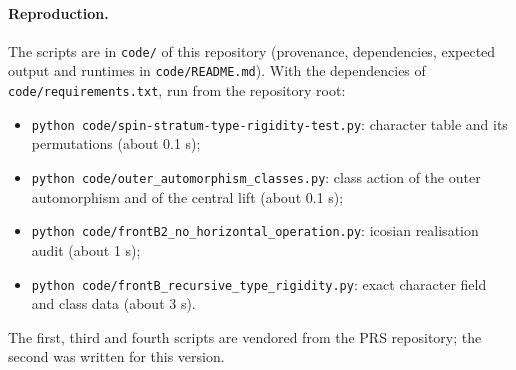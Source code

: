 \documentclass[11pt]{article}
\theoremstyle{definition}
\theoremstyle{remark}
\begin{document}
    \paragraph{Reproduction.}
    The scripts are in \texttt{code/} of this repository (provenance, dependencies, expected output and runtimes in
    \texttt{code/README.md}).
    With the dependencies of \texttt{code/requirements.txt}, run from the repository root:
    \begin{itemize}
      \item \texttt{python code/spin-stratum-type-rigidity-test.py}: character table and its permutations (about 0.1 s);
      \item \texttt{python code/outer\_automorphism\_classes.py}: class action of the outer automorphism and of the
      central lift (about 0.1 s);
      \item \texttt{python code/frontB2\_no\_horizontal\_operation.py}: icosian realisation audit (about 1 s);
      \item \texttt{python code/frontB\_recursive\_type\_rigidity.py}: exact character field and class data (about 3 s).
    \end{itemize}
    The first, third and fourth scripts are vendored from the PRS repository; the second was written for this version.

    \newpage
    
    
\end{document}
